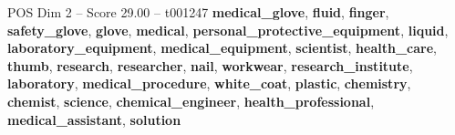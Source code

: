 \begin{textsample}{POS Dim 2 – Score 29.00 – t001247}  \label{ex:f2_pos_015}
\textbf{medical\_glove}, \textbf{fluid}, \textbf{finger}, \textbf{safety\_glove}, \textbf{glove}, \textbf{medical}, \textbf{personal\_protective\_equipment}, \textbf{liquid}, \textbf{laboratory\_equipment}, \textbf{medical\_equipment}, \textbf{scientist}, \textbf{health\_care}, \textbf{thumb}, \textbf{research}, \textbf{researcher}, \textbf{nail}, \textbf{workwear}, \textbf{research\_institute}, \textbf{laboratory}, \textbf{medical\_procedure}, \textbf{white\_coat}, \textbf{plastic}, \textbf{chemistry}, \textbf{chemist}, \textbf{science}, \textbf{chemical\_engineer}, \textbf{health\_professional}, \textbf{medical\_assistant}, \textbf{solution}

\end{textsample}
